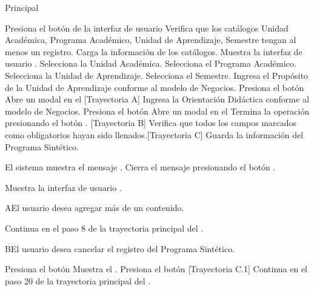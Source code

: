 \begin{UCtrayectoria}{Principal}

\UCpaso[\UCactor] Presiona el botón  de la interfaz de usuario 
\UCpaso Verifica que los catálogos Unidad Académica, Programa Académico, Unidad de Aprendizaje, Semestre tengan al menos un registro.
\UCpaso Carga la información de los catálogos.
\UCpaso Muestra la interfaz de usuario .
\UCpaso[\UCactor] Selecciona la Unidad Académica.
\UCpaso[\UCactor] Selecciona el Programa Académico.
\UCpaso[\UCactor] Selecciona la Unidad de Aprendizaje.
\UCpaso[\UCactor] Selecciona el Semestre.
\UCpaso[\UCactor] Ingresa el Propósito de la Unidad de Aprendizaje conforme al modelo de Negocios.
\UCpaso[\UCactor] Presiona el botón 
\UCpaso Abre un modal en el  [Trayectoria A]
\UCpaso[\UCactor] Ingresa la Orientación Didáctica conforme al modelo de Negocios.
\UCpaso[\UCactor] Presiona el botón 
\UCpaso Abre un modal en el 
\UCpaso[\UCactor] Termina la operación presionando el botón . [Trayectoria B]
\UCpaso Verifica que todos los campos marcados como obligatorios hayan sido llenados.[Trayectoria C]
\UCpaso Guarda la información del Programa Sintético.

\UCpaso El sistema muestra el mensaje .
\UCpaso[\UCactor] Cierra el mensaje presionando el botón . 



\UCpaso Muestra la interfaz de usuario .
\end{UCtrayectoria}


\begin{UCtrayectoriaA}{A}{El usuario desea agregar más de un contenido.}

\UCpaso Continua en el paso 8 de la trayectoria principal del .

\end{UCtrayectoriaA}

\begin{UCtrayectoriaA}{B}{El usuario desea cancelar el registro del Programa Sintético.}

\UCpaso[\UCactor] Presiona el botón 
\UCpaso Muestra el .
\UCpaso[\UCactor] Presiona el botón  [Trayectoria C.1]
\UCpaso Continua en el paso 20 de la trayectoria principal del .

\end{UCtrayectoriaA}

